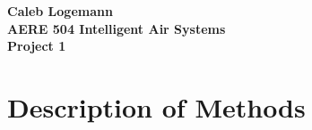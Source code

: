 \documentclass[10pt, oneside]{article}
\begin{document}
\noindent \textbf{\Large{Caleb Logemann \\
AERE 504 Intelligent Air Systems \\
Project 1
}}

\section{Description of Methods}
\end{document}

